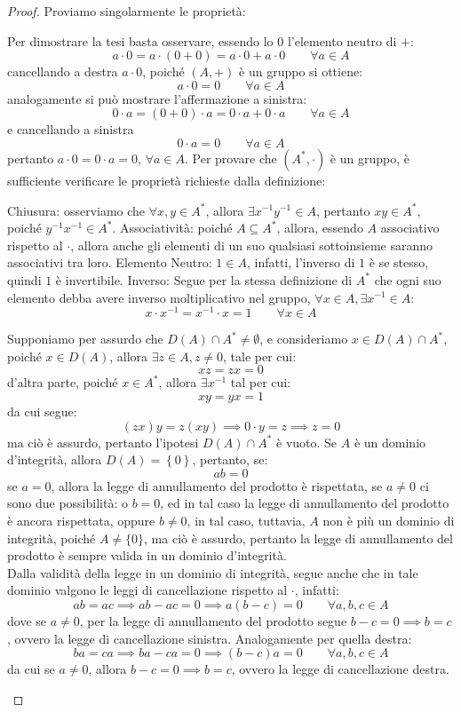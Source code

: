\documentclass[11pt]{scrartcl}
\begin{document}
\begin{proof}
Proviamo singolarmente le proprietà:
	\begin{enumerate}[(1)]
	\ii Per dimostrare la tesi basta osservare, essendo lo $0$ l'elemento neutro di $+$:
		\[ a \cdot 0 = a \cdot (0 + 0) = a \cdot 0 + a \cdot 0
		\qquad
		\forall a \in A
		\]
cancellando a destra $a \cdot 0$, poiché $(A,+)$ è un gruppo si ottiene:
		\[ a \cdot 0 = 0
		\qquad
		\forall a \in A
		\]
analogamente si può mostrare l'affermazione a sinistra:
		\[ 0 \cdot a = (0 + 0) \cdot a = 0 \cdot a + 0 \cdot a
		\qquad
		\forall a \in A
		\]
e cancellando a sinistra
		\[ 0 \cdot a = 0
		\qquad
		\forall a \in A 
		\]
pertanto $a \cdot 0 = 0 \cdot a = 0$, $\forall a \in A$.
	\ii Per provare che $(A^*, \cdot)$ è un gruppo, è sufficiente verificare le proprietà richieste dalla definizione:
	\begin{enumerate}[(a)]
		\ii Chiusura: osserviamo che $\forall x,y \in A^*$, allora $\exists x^{-1}y^{-1} \in A$, pertanto $xy \in A^*$, poiché $y^{-1}x^{-1} \in A^*$. 
		\ii Associatività: poiché $A \subseteq A^*$, allora, essendo $A$ associativo rispetto al $\cdot$, allora anche gli elementi di un suo qualsiasi sottoinsieme saranno associativi tra loro. 
		\ii Elemento Neutro: $1 \in A$, infatti, l'inverso di $1$ è se stesso, quindi $1$ è invertibile.
		\ii Inverso: Segue per la stessa definizione di $A^*$ che ogni suo elemento debba avere inverso moltiplicativo nel gruppo, $\forall x \in A, \exists x^{-1} \in A$:
			\[ x \cdot x^{-1} = x^{-1} \cdot x = 1
			\qquad
			\forall x \in A
			\]
	\end{enumerate}	
	\ii Supponiamo per assurdo che $D(A) \cap A^* \neq \emptyset$, e consideriamo $x \in D(A) \cap A^*$, poiché $x \in D(A)$, allora $\exists z \in A, z \ne 0$, tale per cui:
		\[ xz = zx = 0
		\]
d'altra parte, poiché $x \in A^*$, allora $\exists x^{-1}$ tal per cui:
		\[  xy = yx = 1
		\]
da cui segue:
		\[ (zx)y = z(xy) \implies 0 \cdot y = z \implies z = 0
		\]
ma ciò è assurdo, pertanto l'ipotesi $D(A) \cap A^*$ è vuoto.
	\ii Se $A$ è un dominio d'integrità, allora $D(A)=\left\{0\right\}$, pertanto, se:
		\[ ab=0
		\]
	se $a=0$, allora la legge di annullamento del prodotto è rispettata, se $a\neq 0$ ci sono due possibilità: o $b=0$, ed in tal caso la legge di annullamento del prodotto è ancora rispettata, oppure $b \neq 0$, in tal caso, tuttavia, $A$ non è più un dominio di integrità, poiché $A \neq \{0\}$, ma ciò è assurdo, pertanto la legge di annullamento del prodotto è sempre valida in un dominio d'integrità. \\
Dalla validità della legge in un dominio di integrità, segue anche che in tale dominio valgono le leggi di cancellazione rispetto al $\cdot$, infatti:
		\[ ab=ac \implies ab - ac = 0 \implies a(b-c)=0
		\qquad
		\forall a,b,c \in A
		\]
dove se $a \ne 0$, per la legge di annullamento del prodotto segue $b-c=0 \implies b=c$, ovvero la legge di cancellazione sinistra. Analogamente per quella destra:
		\[ ba=ca \implies ba - ca = 0 \implies (b-c)a =0
		\qquad
		\forall a,b,c \in A
		\]
da cui se $a \ne 0$, allora  $b-c=0 \implies b=c$, ovvero la legge di cancellazione destra.
	\end{enumerate}
\end{proof}
\end{document}
